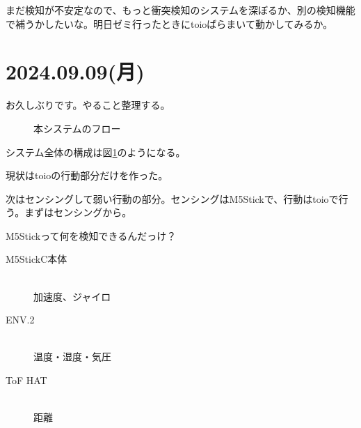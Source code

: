 \documentclass[fleqn,twocolumn]{mynote}
\begin{document}
  まだ検知が不安定なので、もっと衝突検知のシステムを深ぼるか、別の検知機能で補うかしたいな。明日ゼミ行ったときにtoioばらまいて動かしてみるか。

  \section*{2024.09.09(月)}
  お久しぶりです。やること整理する。

  \fboxsep=0pt            %
  \fboxrule=1pt            %
  \begin{figure}[h]
    \centering
    \caption{本システムのフロー}
    \label{fig:weak-toio-system-flow}
  \end{figure}

  システム全体の構成は図\ref*{fig:weak-toio-system-flow}のようになる。

  現状はtoioの行動部分だけを作った。

  次はセンシングして弱い行動の部分。センシングはM5Stickで、行動はtoioで行う。まずはセンシングから。

  M5Stickって何を検知できるんだっけ？

  \begin{description}
    \item[M5StickC本体]\mbox{}\\
      加速度、ジャイロ
    \item[ENV.2]\mbox{}\\
      温度・湿度・気圧
    \item[ToF HAT]\mbox{}\\
      距離
  \end{description}
\end{document}
